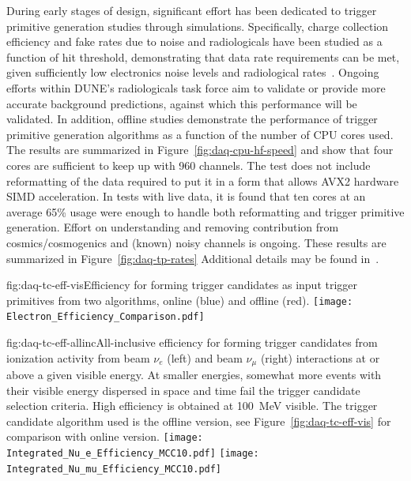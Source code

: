 During early stages of design, significant effort has been dedicated to
trigger primitive generation studies through simulations.
Specifically, charge collection efficiency and fake rates due to noise
and radiologicals have been studied as a function of hit threshold,
demonstrating that data rate requirements can be met, given sufficiently low
electronics noise levels and radiological rates~\cite{bib:docdb11236}. 
Ongoing efforts within DUNE's radiologicals task force aim to validate
or provide more accurate background predictions, against which this
performance will be validated.
In addition, offline studies demonstrate the performance of trigger
primitive generation algorithms as a function of the number of CPU cores
used.  
The results are summarized in Figure~\ref{fig:daq-cpu-hf-speed} and show
that four cores are sufficient to keep up with 960 channels.
The test does not include reformatting of the data required to put it in
a form that allows AVX2 hardware SIMD acceleration.
In tests with live  data, it is found that ten cores at
an average 65\% usage were enough to handle both reformatting and
trigger primitive generation. 
Effort on understanding and removing contribution
from cosmics/cosmogenics and (known) noisy channels is ongoing.
These results are summarized in Figure~\ref{fig:daq-tp-rates}
Additional details may be found in~.

\begin{dunefigure}{fig:daq-tc-eff-vis}{Efficiency for forming trigger candidates as input trigger primitives from two algorithms, online (blue) and offline (red).}
  \texttt{[image: Electron\_Efficiency\_Comparison.pdf]}
\end{dunefigure}

\begin{dunefigure}{fig:daq-tc-eff-allinc}{All-inclusive efficiency for
    forming trigger candidates from ionization activity from beam $\nu_e$
    (left) and beam $\nu_\mu$ (right) interactions at or above a given
    visible energy. 
    At smaller energies, somewhat more events with their visible energy
    dispersed in space and time fail the trigger candidate selection
    criteria. 
    High efficiency is obtained at \SI{100}{\MeV} visible. 
    The trigger candidate algorithm used is the offline version, see
    Figure~\ref{fig:daq-tc-eff-vis} for comparison with online version.}
  \texttt{[image: Integrated\_Nu\_e\_Efficiency\_MCC10.pdf]}%
  \texttt{[image: Integrated\_Nu\_mu\_Efficiency\_MCC10.pdf]}
\end{dunefigure}


